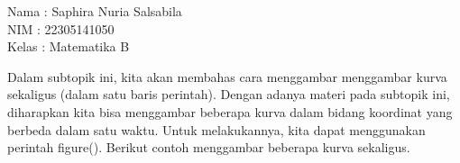 \documentclass{article}
\begin{document}
\begin{eulernotebook}
\begin{eulercomment}
Nama  : Saphira Nuria Salsabila\\
NIM   : 22305141050\\
Kelas : Matematika B

\end{eulercomment}
\eulersubheading{}
\begin{eulercomment}
Dalam subtopik ini, kita akan membahas cara menggambar menggambar
kurva sekaligus (dalam satu baris perintah). Dengan adanya materi pada
subtopik ini, diharapkan kita bisa menggambar beberapa kurva dalam
bidang koordinat yang berbeda dalam satu waktu. Untuk melakukannya,
kita dapat menggunakan perintah figure(). Berikut contoh menggambar
beberapa kurva sekaligus.


\end{eulercomment}
\end{eulernotebook}
\end{document}

